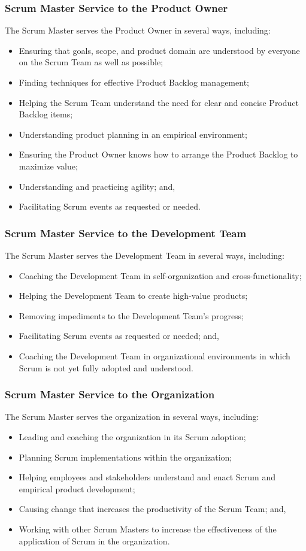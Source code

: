 \subsubsection{Scrum Master Service to the Product Owner}
The Scrum Master serves the Product Owner in several ways, including:
\begin{itemize}
\item Ensuring that goals, scope, and product domain are understood by everyone on the Scrum
      Team as well as possible;
\item Finding techniques for effective Product Backlog management;
\item Helping the Scrum Team understand the need for clear and concise Product Backlog items;
\item Understanding product planning in an empirical environment;
\item Ensuring the Product Owner knows how to arrange the Product Backlog to maximize value;
\item Understanding and practicing agility; and,
\item Facilitating Scrum events as requested or needed.
\end{itemize}

\subsubsection{Scrum Master Service to the Development Team}
The Scrum Master serves the Development Team in several ways, including:
\begin{itemize}
\item Coaching the Development Team in self-organization and cross-functionality;
\item Helping the Development Team to create high-value products;
\item Removing impediments to the Development Team's progress;
\item Facilitating Scrum events as requested or needed; and,
\item Coaching the Development Team in organizational environments in which Scrum is not yet
      fully adopted and understood.
\end{itemize}

\subsubsection{Scrum Master Service to the Organization}
The Scrum Master serves the organization in several ways, including:
\begin{itemize}
\item Leading and coaching the organization in its Scrum adoption;
\item Planning Scrum implementations within the organization;
\item Helping employees and stakeholders understand and enact Scrum and empirical product
      development;
\item Causing change that increases the productivity of the Scrum Team; and,
\item Working with other Scrum Masters to increase the effectiveness of the application of Scrum
      in the organization.
\end{itemize}

